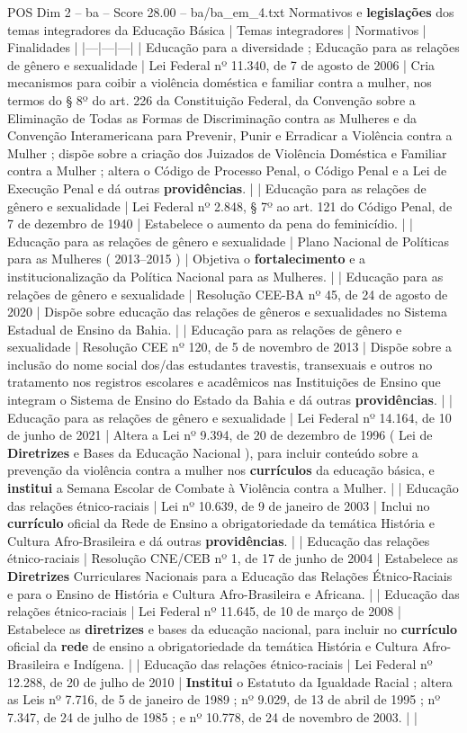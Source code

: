 \begin{textsample}{POS Dim 2 – ba – Score 28.00 – ba/ba\_em\_4.txt}
Normativos e \textbf{legislações} dos temas integradores da Educação Básica | Temas integradores | Normativos | Finalidades | |---|---|---| | Educação para a diversidade ; Educação para as relações de gênero e sexualidade | Lei Federal nº 11.340, de 7 de agosto de 2006 | Cria mecanismos para coibir a violência doméstica e familiar contra a mulher, nos termos do § 8º do art. 226 da Constituição Federal, da Convenção sobre a Eliminação de Todas as Formas de Discriminação contra as Mulheres e da Convenção Interamericana para Prevenir, Punir e Erradicar a Violência contra a Mulher ; dispõe sobre a criação dos Juizados de Violência Doméstica e Familiar contra a Mulher ; altera o Código de Processo Penal, o Código Penal e a Lei de Execução Penal e dá outras \textbf{providências}. | | Educação para as relações de gênero e sexualidade | Lei Federal nº 2.848, § 7º ao art. 121 do Código Penal, de 7 de dezembro de 1940 | Estabelece o aumento da pena do feminicídio. | | Educação para as relações de gênero e sexualidade | Plano Nacional de Políticas para as Mulheres ( 2013–2015 ) | Objetiva o \textbf{fortalecimento} e a institucionalização da Política Nacional para as Mulheres. | | Educação para as relações de gênero e sexualidade | Resolução CEE-BA nº 45, de 24 de agosto de 2020 | Dispõe sobre educação das relações de gêneros e sexualidades no Sistema Estadual de Ensino da Bahia. | | Educação para as relações de gênero e sexualidade | Resolução CEE nº 120, de 5 de novembro de 2013 | Dispõe sobre a inclusão do nome social dos/das estudantes travestis, transexuais e outros no tratamento nos registros escolares e acadêmicos nas Instituições de Ensino que integram o Sistema de Ensino do Estado da Bahia e dá outras \textbf{providências}. | | Educação para as relações de gênero e sexualidade | Lei Federal nº 14.164, de 10 de junho de 2021 | Altera a Lei nº 9.394, de 20 de dezembro de 1996 ( Lei de \textbf{Diretrizes} e Bases da Educação Nacional ), para incluir conteúdo sobre a prevenção da violência contra a mulher nos \textbf{currículos} da educação básica, e \textbf{institui} a Semana Escolar de Combate à Violência contra a Mulher. | | Educação das relações étnico-raciais | Lei nº 10.639, de 9 de janeiro de 2003 | Inclui no \textbf{currículo} oficial da Rede de Ensino a obrigatoriedade da temática História e Cultura Afro-Brasileira e dá outras \textbf{providências}. | | Educação das relações étnico-raciais | Resolução CNE/CEB nº 1, de 17 de junho de 2004 | Estabelece as \textbf{Diretrizes} Curriculares Nacionais para a Educação das Relações Étnico-Raciais e para o Ensino de História e Cultura Afro-Brasileira e Africana. | | Educação das relações étnico-raciais | Lei Federal nº 11.645, de 10 de março de 2008 | Estabelece as \textbf{diretrizes} e bases da educação nacional, para incluir no \textbf{currículo} oficial da \textbf{rede} de ensino a obrigatoriedade da temática História e Cultura Afro-Brasileira e Indígena. | | Educação das relações étnico-raciais | Lei Federal nº 12.288, de 20 de julho de 2010 | \textbf{Institui} o Estatuto da Igualdade Racial ; altera as Leis nº 7.716, de 5 de janeiro de 1989 ; nº 9.029, de 13 de abril de 1995 ; nº 7.347, de 24 de julho de 1985 ; e nº 10.778, de 24 de novembro de 2003. | | 
\end{textsample}
